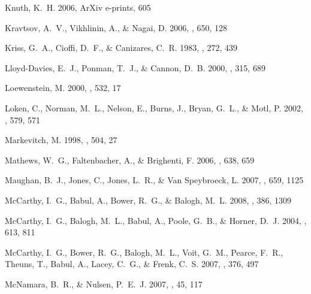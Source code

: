 \documentclass[12pt,preprint]{aastex}
\begin{document}
\begin{thebibliography}{137}
{Knuth}, K.~H. 2006, ArXiv e-prints, 605

{Kravtsov}, A.~V., {Vikhlinin}, A., \& {Nagai}, D. 2006, \apj, 650, 128

{Kriss}, G.~A., {Cioffi}, D.~F., \& {Canizares}, C.~R. 1983, \apj, 272, 439

{Lloyd-Davies}, E.~J., {Ponman}, T.~J., \& {Cannon}, D.~B. 2000, \mnras, 315,
  689

{Loewenstein}, M. 2000, \apj, 532, 17

{Loken}, C., {Norman}, M.~L., {Nelson}, E., {Burns}, J., {Bryan}, G.~L., \&
  {Motl}, P. 2002, \apj, 579, 571

{Markevitch}, M. 1998, \apj, 504, 27

{Mathews}, W.~G., {Faltenbacher}, A., \& {Brighenti}, F. 2006, \apj, 638, 659

{Maughan}, B.~J., {Jones}, C., {Jones}, L.~R., \& {Van Speybroeck}, L. 2007,
  \apj, 659, 1125

{McCarthy}, I.~G., {Babul}, A., {Bower}, R.~G., \& {Balogh}, M.~L. 2008,
  \mnras, 386, 1309

{McCarthy}, I.~G., {Balogh}, M.~L., {Babul}, A., {Poole}, G.~B., \& {Horner},
  D.~J. 2004, \apj, 613, 811

{McCarthy}, I.~G., {Bower}, R.~G., {Balogh}, M.~L., {Voit}, G.~M., {Pearce},
  F.~R., {Theuns}, T., {Babul}, A., {Lacey}, C.~G., \& {Frenk}, C.~S. 2007,
  \mnras, 376, 497

{McNamara}, B.~R., \& {Nulsen}, P.~E.~J. 2007, \araa, 45, 117


\end{thebibliography}
\end{document}
